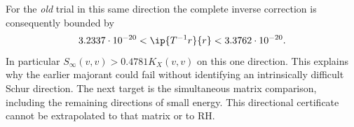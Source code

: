 For the \emph{old} trial in this same direction the complete inverse
correction is consequently bounded by
\[
 3.2337\cdot10^{-20}<\ip{T^{-1}r}{r}
       <3.3762\cdot10^{-20}.
\]
In particular $S_\infty(v,v)>0.4781K_X(v,v)$ on this one
direction. This explains why the earlier majorant could fail
without identifying an intrinsically difficult Schur direction.
The next target is the simultaneous matrix comparison, including
the remaining directions of small energy. This directional
certificate cannot be extrapolated to that matrix or to RH.
